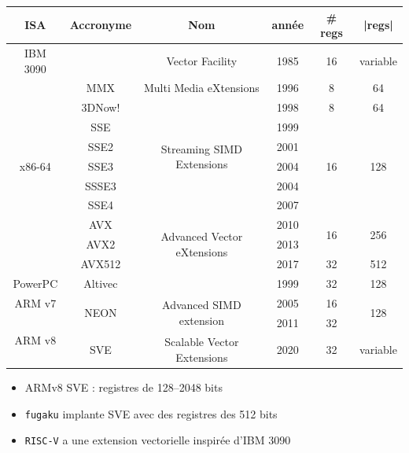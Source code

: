 \documentclass[xcolor={x11names,svgnames}]{beamer}
\begin{document}
\begin{frame}
\end{frame}


\begin{frame}
  \scriptsize
  \begin{tabular}{|c||c|c|c|c|c|}
  \hline
  ISA & Accronyme & Nom & année & \# regs & |regs| \\
  \hline  \hline
    IBM 3090 & & Vector Facility & 1985 & 16 & variable \\ 
    \hline  \hline
  \multirow{9}{*}{x86-64} & MMX & Multi Media eXtensions & 1996 & 8 & 64 \\
  \cline{2-6}
  & 3DNow! &                                            & 1998 & 8  &  64 \\
    \cline{2-6}
  & SSE    & \multirow{4}{*}{Streaming SIMD Extensions} & 1999 & \multirow{5}{*}{16} & \multirow{5}{*}{128} \\
  & SSE2   &                           & 2001 &         & \\
  & SSE3   &                           & 2004 &         & \\
  & SSSE3  &                           & 2004 &         & \\
  & SSE4   &                           & 2007 &         & \\
    \cline{2-6}
  & AVX    & \multirow{3}{*}{Advanced Vector eXtensions} & 2010 & \multirow{2}{*}{16} & \multirow{2}{*}{256} \\
  & AVX2   &                           & 2013  &    &     \\
    \cline{2-2}\cline{4-6}
  & AVX512 &                           & 2017  & 32 & 512 \\
  \hline\hline
  PowerPC & Altivec & & 1999 & 32 & 128 \\
  \hline\hline
  ARM v7 & \multirow{2}{*}{NEON} & \multirow{2}{*}{Advanced SIMD extension}    & 2005 & 16 & \multirow{2}{*}{128} \\
  \cline{1-1}%
  \multirow{2}{*}{ARM v8} &      &                            & 2011 & 32 &  \\
  \cline{2-6}
   & SVE  & Scalable Vector Extensions & 2020 & 32 & variable \\
  \hline
\end{tabular}  

\bigskip

\normalsize
\begin{itemize}
\item ARMv8 SVE : registres de 128--2048 bits
\item \texttt{fugaku} implante SVE avec des registres des 512 bits
\item \texttt{RISC-V} a une extension vectorielle inspirée d'IBM 3090
\end{itemize}
\end{frame}
\end{document}
